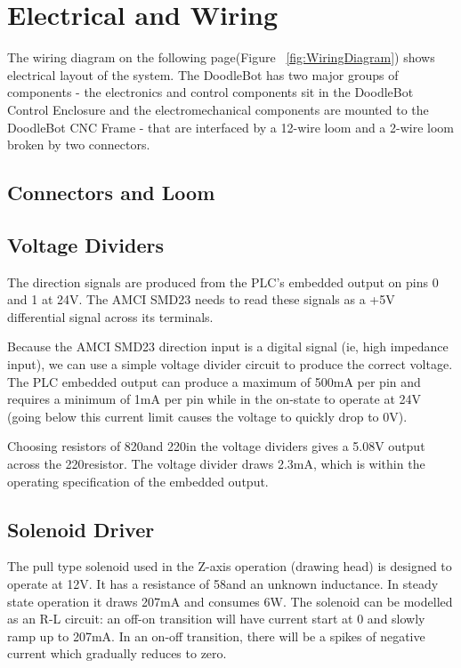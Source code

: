 \section{Electrical and Wiring}

	The wiring diagram on the following page(Figure ~\ref{fig:WiringDiagram}) shows electrical layout of the system. The DoodleBot has two major groups of components - the electronics and control components sit in the DoodleBot Control Enclosure and the electromechanical components are mounted to the DoodleBot CNC Frame - that are interfaced by a 12-wire loom and a 2-wire loom broken by two connectors.
	
	\subsection{Connectors and Loom}
	
	\subsection{Voltage Dividers}
		The direction signals are produced from the PLC's embedded output on pins 0 and 1 at 24V. The AMCI SMD23 needs to read these signals as a +5V differential signal across its terminals.
		
		Because the AMCI SMD23 direction input is a digital signal (ie, high impedance input), we can use a simple voltage divider circuit to produce the correct voltage. The PLC embedded output can produce a maximum of 500mA per pin and requires a minimum of 1mA per pin while in the on-state to operate at 24V (going below this current limit causes the voltage to quickly drop to 0V).
		
		Choosing resistors of 820\Omega and 220\Omega in the voltage dividers gives a 5.08V output across the 220\Omega resistor. The voltage divider draws 2.3mA, which is within the operating specification of the embedded output.
	\subsection{Solenoid Driver}
		The pull type solenoid used in the Z-axis operation (drawing head) is designed to operate at 12V. It has a resistance of 58\Omega and an unknown inductance. In steady state operation it draws 207mA and consumes 6W. The solenoid can be modelled as an R-L circuit: an off-on transition will have current start at 0 and slowly ramp up to 207mA. In an on-off transition, there will be a spikes of negative current which gradually reduces to zero.
		
